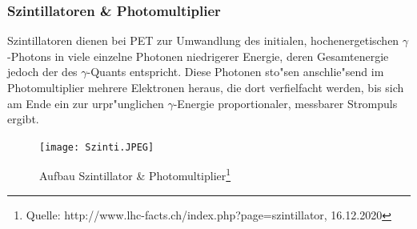 \documentclass{article}
\begin{document}
\subsubsection{Szintillatoren \& Photomultiplier}

Szintillatoren dienen bei PET zur Umwandlung des initialen, hochenergetischen $\gamma$-Photons in viele einzelne Photonen niedrigerer Energie, deren Gesamtenergie jedoch der des $\gamma$-Quants entspricht. Diese Photonen sto"sen anschlie"send im Photomultiplier mehrere Elektronen heraus, die dort verfielfacht werden, bis sich am Ende ein zur urpr"unglichen $\gamma$-Energie proportionaler, messbarer Strompuls ergibt.

\begin{figure}[!ht]
	\centering
	\texttt{[image: Szinti.JPEG]}
	\caption{Aufbau Szintillator \& Photomultiplier\footnote{Quelle: http://www.lhc-facts.ch/index.php?page=szintillator, 16.12.2020}}
	\label{figSzinti}
\end{figure}
\end{document}

